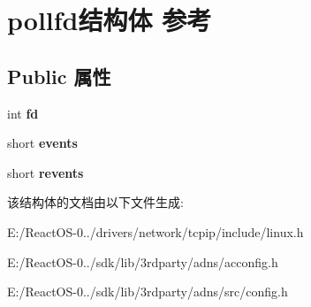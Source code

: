 \hypertarget{structpollfd}{}\section{pollfd结构体 参考}
\label{structpollfd}
\subsection*{Public 属性}
\begin{DoxyCompactItemize}
\item 
\mbox{\label{structpollfd_a57e1c316fb063e468d680b6246147861}} 
int {\bfseries fd}
\item 
\mbox{\label{structpollfd_ac9b2f2c5b1f9a7487eb57e67cd4960ef}} 
short {\bfseries events}
\item 
\mbox{\label{structpollfd_aafb457d11cac415faf0e1e2b825118c2}} 
short {\bfseries revents}
\end{DoxyCompactItemize}


该结构体的文档由以下文件生成\+:\begin{DoxyCompactItemize}
\item 
E\+:/\+React\+O\+S-\/0../drivers/network/tcpip/include/linux.\+h\item 
E\+:/\+React\+O\+S-\/0../sdk/lib/3rdparty/adns/acconfig.\+h\item 
E\+:/\+React\+O\+S-\/0../sdk/lib/3rdparty/adns/src/config.\+h\end{DoxyCompactItemize}
